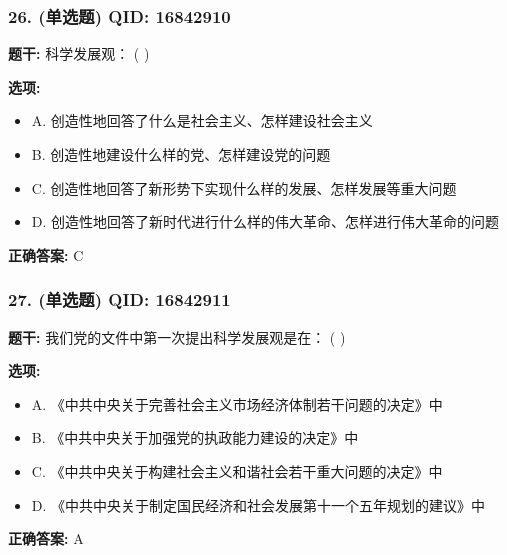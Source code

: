 \documentclass[12pt,UTF8]{ctexart}
\begin{document}
\subsubsection*{26. (单选题) \small QID: 16842910}

\textbf{题干:}
科学发展观： ( )

\textbf{选项:}
\begin{itemize}[leftmargin=*]

  \item A. 创造性地回答了什么是社会主义、怎样建设社会主义

  \item B. 创造性地建设什么样的党、怎样建设党的问题

  \item C. 创造性地回答了新形势下实现什么样的发展、怎样发展等重大问题

  \item D. 创造性地回答了新时代进行什么样的伟大革命、怎样进行伟大革命的问题

\end{itemize}

\textbf{正确答案:}
C

\vspace{0.3em}\hrulefill\vspace{0.7em}

\subsubsection*{27. (单选题) \small QID: 16842911}

\textbf{题干:}
我们党的文件中第一次提出科学发展观是在： ( )

\textbf{选项:}
\begin{itemize}[leftmargin=*]

  \item A. 《中共中央关于完善社会主义市场经济体制若干问题的决定》中

  \item B. 《中共中央关于加强党的执政能力建设的决定》中

  \item C. 《中共中央关于构建社会主义和谐社会若干重大问题的决定》中

  \item D. 《中共中央关于制定国民经济和社会发展第十一个五年规划的建议》中

\end{itemize}

\textbf{正确答案:}
A

\vspace{0.3em}\hrulefill\vspace{0.7em}
\end{document}
